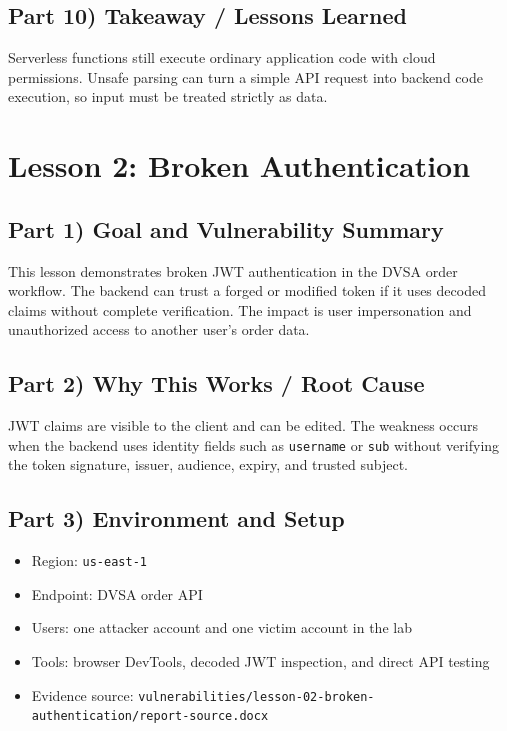 \documentclass[12pt]{article}
\begin{document}
\subsection*{Part 10) Takeaway / Lessons Learned}
Serverless functions still execute ordinary application code with cloud permissions. Unsafe parsing can turn a simple API request into backend code execution, so input must be treated strictly as data.

\clearpage
\section{Lesson 2: Broken Authentication}

\subsection*{Part 1) Goal and Vulnerability Summary}
This lesson demonstrates broken JWT authentication in the DVSA order workflow. The backend can trust a forged or modified token if it uses decoded claims without complete verification. The impact is user impersonation and unauthorized access to another user's order data.

\subsection*{Part 2) Why This Works / Root Cause}
JWT claims are visible to the client and can be edited. The weakness occurs when the backend uses identity fields such as \texttt{username} or \texttt{sub} without verifying the token signature, issuer, audience, expiry, and trusted subject.

\subsection*{Part 3) Environment and Setup}
\begin{itemize}
\item Region: \texttt{us-east-1}
\item Endpoint: DVSA order API
\item Users: one attacker account and one victim account in the lab
\item Tools: browser DevTools, decoded JWT inspection, and direct API testing
\item Evidence source: \texttt{vulnerabilities/lesson-02-broken-authentication/report-source.docx}
\end{itemize}
\end{document}
